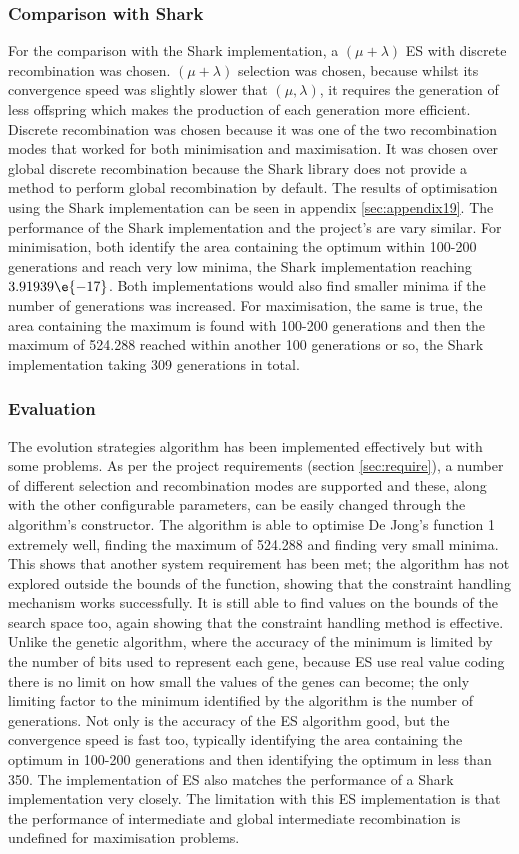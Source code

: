 \subsubsection{Comparison with Shark}
For the comparison with the Shark implementation, a $(\mu+\lambda)$ ES with discrete recombination was chosen. $(\mu+\lambda)$ selection was chosen, because whilst its convergence speed was slightly slower that $(\mu,\lambda)$, it requires the generation of less offspring which makes the production of each generation more efficient. Discrete recombination was chosen because it was one of the two recombination modes that worked for both minimisation and maximisation. It was chosen over global discrete recombination because the Shark library does not provide a method to perform global recombination by default. The results of optimisation using the Shark implementation can be seen in appendix \ref{sec:appendix19}. The performance of the Shark implementation and the project's are vary similar. For minimisation, both identify the area containing the optimum within 100-200 generations and reach very low minima, the Shark implementation reaching $3.91939\e{-17}$. Both implementations would also find smaller minima if the number of generations was increased. For maximisation, the same is true, the area containing the maximum is found with 100-200 generations and then the maximum of 524.288 reached within another 100 generations or so, the Shark implementation taking 309 generations in total.

\subsubsection{Evaluation}
The evolution strategies algorithm has been implemented effectively but with some problems. As per the project requirements (section \ref{sec:require}), a number of different selection and recombination modes are supported and these, along with the other configurable parameters, can be easily changed through the algorithm's constructor. The algorithm is able to optimise De Jong's function 1 extremely well, finding the maximum of 524.288 and finding very small minima. This shows that another system requirement has been met; the algorithm has not explored outside the bounds of the function, showing that the constraint handling mechanism works successfully. It is still able to find values on the bounds of the search space too, again showing that the constraint handling method is effective. Unlike the genetic algorithm, where the accuracy of the minimum is limited by the number of bits used to represent each gene, because ES use real value coding there is no limit on how small the values of the genes can become; the only limiting factor to the minimum identified by the algorithm is the number of generations. Not only is the accuracy of the ES algorithm good, but the convergence speed is fast too, typically identifying the area containing the optimum in 100-200 generations and then identifying the optimum in less than 350. The implementation of ES also matches the performance of a Shark implementation very closely. The limitation with this ES implementation is that the performance of intermediate and global intermediate recombination is undefined for maximisation problems.

